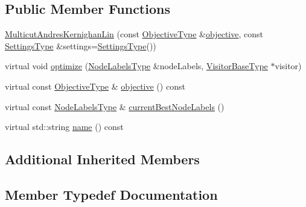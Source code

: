 \subsection*{Public Member Functions}
\begin{DoxyCompactItemize}
\item 
\hyperlink{classnifty_1_1graph_1_1opt_1_1multicut_1_1MulticutAndresKernighanLin_ae6f8a37ea05219cd63ae259f0dcede5b}{Multicut\+Andres\+Kernighan\+Lin} (const \hyperlink{classnifty_1_1graph_1_1opt_1_1multicut_1_1MulticutAndres_aed60c2f4ed9c6c6b97e8b513d7a48e86}{Objective\+Type} \&\hyperlink{classnifty_1_1graph_1_1opt_1_1multicut_1_1MulticutAndresKernighanLin_aaf7fb543729a5be9211a8dd5400b404a}{objective}, const \hyperlink{structnifty_1_1graph_1_1opt_1_1multicut_1_1MulticutAndresKernighanLin_1_1SettingsType}{Settings\+Type} \&settings=\hyperlink{structnifty_1_1graph_1_1opt_1_1multicut_1_1MulticutAndresKernighanLin_1_1SettingsType}{Settings\+Type}())
\item 
virtual void \hyperlink{classnifty_1_1graph_1_1opt_1_1multicut_1_1MulticutAndresKernighanLin_af4f27f04beb50edb810b4e750bbc8b46}{optimize} (\hyperlink{classnifty_1_1graph_1_1opt_1_1multicut_1_1MulticutAndres_a6cd9d64abc4a98aa9745ce1ef0d4ecfe}{Node\+Labels\+Type} \&node\+Labels, \hyperlink{classnifty_1_1graph_1_1opt_1_1multicut_1_1MulticutAndres_a295da342b6ebe8a8720cadd1dcce2e57}{Visitor\+Base\+Type} $\ast$visitor)
\item 
virtual const \hyperlink{classnifty_1_1graph_1_1opt_1_1multicut_1_1MulticutAndres_aed60c2f4ed9c6c6b97e8b513d7a48e86}{Objective\+Type} \& \hyperlink{classnifty_1_1graph_1_1opt_1_1multicut_1_1MulticutAndresKernighanLin_aaf7fb543729a5be9211a8dd5400b404a}{objective} () const
\item 
virtual const \hyperlink{classnifty_1_1graph_1_1opt_1_1multicut_1_1MulticutAndres_a6cd9d64abc4a98aa9745ce1ef0d4ecfe}{Node\+Labels\+Type} \& \hyperlink{classnifty_1_1graph_1_1opt_1_1multicut_1_1MulticutAndresKernighanLin_ab06bb2d0f90c255f35453aad5b06eea3}{current\+Best\+Node\+Labels} ()
\item 
virtual std\+::string \hyperlink{classnifty_1_1graph_1_1opt_1_1multicut_1_1MulticutAndresKernighanLin_ac4b9f02bd36b35faf2ace3e87a224dcc}{name} () const
\end{DoxyCompactItemize}
\subsection*{Additional Inherited Members}


\subsection{Member Typedef Documentation}
\mbox{\label{classnifty_1_1graph_1_1opt_1_1multicut_1_1MulticutAndresKernighanLin_ab78f50b4aea673a5906827b7edae099f}} 
